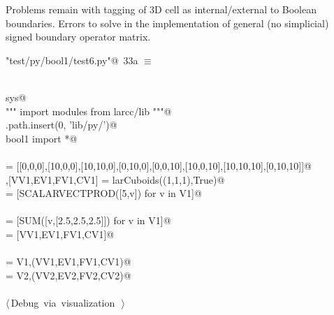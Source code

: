 \documentclass[11pt,oneside]{article}	%
\begin{document}
Problems remain with tagging of 3D cell as internal/external to Boolean boundaries. Errors to solve in the implementation of  general (no simplicial) signed boundary operator matrix.


\begin{flushleft} \small \label{scrap40}
\protect{}\verb@"test/py/bool1/test6.py"@\nobreak\ {\footnotesize 33a }$\equiv$
\vspace{-1ex}
\begin{list}{}{} \item
\mbox{}\verb@@\\
\mbox{}\verb@import sys@\\
\mbox{}\verb@""" import modules from larcc/lib """@\\
\mbox{}\verb@sys.path.insert(0, 'lib/py/')@\\
\mbox{}\verb@from bool1 import *@\\
\mbox{}\verb@@\\
\mbox{} = [[0,0,0],[10,0,0],[10,10,0],[0,10,0],[0,0,10],[10,0,10],[10,10,10],[0,10,10]]@\\
\mbox{},[VV1,EV1,FV1,CV1] = larCuboids((1,1,1),True)@\\
\mbox{} = [SCALARVECTPROD([5,v]) for v in V1]@\\
\mbox{}\verb@@\\
\mbox{} = [SUM([v,[2.5,2.5,2.5]]) for v in V1]@\\
\mbox{}\verb@[VV2,EV2,FV2,CV2] = [VV1,EV1,FV1,CV1]@\\
\mbox{}\verb@@\\
\mbox{} = V1,(VV1,EV1,FV1,CV1)@\\
\mbox{} = V2,(VV2,EV2,FV2,CV2)@\\
\mbox{}\verb@@\\
\mbox{}\verb@@\hbox{$\langle\,$Debug via visualization\nobreak\ {\footnotesize {}}$\,\rangle$}\verb@@\\
\mbox{}\verb@@{\NWsep}
\end{list}
\vspace{-2ex}
\end{flushleft}
\end{document}
